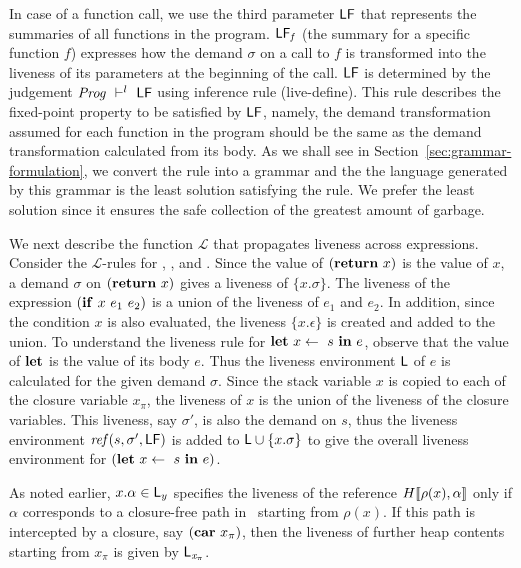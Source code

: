\documentclass[preprint, 9pt]{sigplanconf}
\begin{document}
In case of a  function call, we  use the third  parameter $\mathsf{LF}$
that  represents  the  summaries  of all  functions  in  the  program.
$\mathsf{LF}_{\mathit  f}$  (the summary for a  specific
function $f$) expresses  how the demand $\sigma$ on a  call to $f$ is
transformed into  the liveness of  its parameters at the  beginning of
the  call.  $\mathsf{LF}$  is determined  by the  judgement $\mathit{Prog}
\ \vdash^l\   \mathsf{LF}$ using  inference rule  ({\sc live-define}).   This rule
describes  the  fixed-point property  to  be  satisfied by  $\mathsf{LF}$,
namely, the  demand transformation  assumed for  each function  in the
program should  be the  same as  the demand  transformation calculated
from      its      body.       As       we      shall      see      in
Section~\ref{sec:grammar-formulation},  we  convert  the rule  into  a
grammar and  the the language generated  by this grammar is  the least
solution satisfying  the rule. We  prefer the least solution  since it
ensures the safe collection of the greatest amount of garbage.

We next  describe the function $\mathcal{L}$  that propagates liveness
across  expressions.   Consider  the $\mathcal{L}$-rules  for  {\LET},
{\SIF}, and {\SRETURN}.  Since the value of $(\mbox{$\mathbf{ return}$}~x)$ is the
value  of  $x$,  a  demand $\sigma$  on  $(\mbox{$\mathbf{ return}$}~x)$  gives  a
liveness   of  $\{x.\sigma\}$.    The  liveness   of  the   expression
$(\mbox{$\mathbf{ if}$}~x~e_1~e_2)$  is  a union  of  the  liveness of  $e_1$  and
$e_2$. In  addition, since  the condition $x$  is also  evaluated, the
liveness $\{x.\epsilon\}$ is created and  added to the union.  
To  understand  the  liveness rule  for  $\mbox{$\mathbf{ let}$}~x  \leftarrow~s~\mbox{$\mathbf{ in}$}~e$,
observe that the value  of $\mbox{$\mathbf{ let}$}$ is the value of  its body $e$.  Thus
the  liveness environment  $\mathsf{L}$ of  $e$ is  calculated for  the given
demand $\sigma$. Since the stack variable $x$ is copied to each of the
closure variable  $x_{\pi}$, the liveness of  $x$ is the union  of the
liveness of the  closure variables.  This liveness,  say $\sigma'$, is
also  the  demand  on  $s$, thus the  liveness  environment
$\mathit{ref}(s,   \sigma',   \mathsf{LF})$   is  added   to   $\mathsf{L}   \cup
\{x.\sigma\}$ to  give the  overall liveness environment  for $(\mbox{$\mathbf{ let}$}~x
\leftarrow~s~\mbox{$\mathbf{ in}$}~e)$.

As noted earlier, $x.\alpha \in  \mathsf{L}_y$ specifies the liveness  of the
reference $H\llbracket\rho(x), \alpha\rrbracket$  only if $\alpha$ corresponds to  a closure-free path
in \heap\   starting from $\rho(x)$.  If this  path is intercepted  by a
closure,  say  $(\mbox{$\mathbf{car}$}~{x_{\pi}})$, then  the  liveness  of further  heap
contents starting from $\mathit{x_{\pi}}$ is given by $\mathsf{L}_\mathit{x_{\pi}}$.
\end{document}
